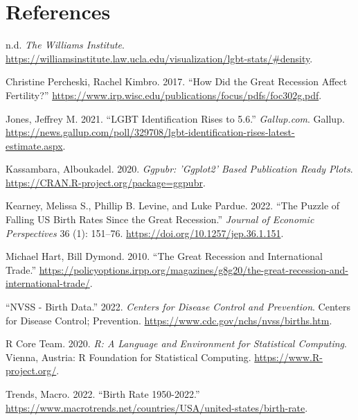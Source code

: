 \documentclass[
]{article}
\newlength{\cslhangindent}
\newlength{\cslentryspacingunit} %
\newenvironment{CSLReferences}[2] %
 {%
  \setlength{\parindent}{0pt}
  \ifodd #1
  \let\oldpar\par
  \def\par{\hangindent=\cslhangindent\oldpar}
  \fi
  \setlength{\parskip}{#2\cslentryspacingunit}
 }%
 {}
\begin{document}
\hypertarget{references}{%
\section*{References}\label{references}}

\hypertarget{refs}{}
\begin{CSLReferences}{1}{0}
\leavevmode{}%
n.d. \emph{The Williams Institute}. \url{https://williamsinstitute.law.ucla.edu/visualization/lgbt-stats/\#density}.

\leavevmode{}%
Christine Percheski, Rachel Kimbro. 2017. {``How Did the Great Recession Affect Fertility?''} \url{https://www.irp.wisc.edu/publications/focus/pdfs/foc302g.pdf}.

\leavevmode{}%
Jones, Jeffrey M. 2021. {``LGBT Identification Rises to 5.6.''} \emph{Gallup.com}. Gallup. \url{https://news.gallup.com/poll/329708/lgbt-identification-rises-latest-estimate.aspx}.

\leavevmode{}%
Kassambara, Alboukadel. 2020. \emph{Ggpubr: 'Ggplot2' Based Publication Ready Plots}. \url{https://CRAN.R-project.org/package=ggpubr}.

\leavevmode{}%
Kearney, Melissa S., Phillip B. Levine, and Luke Pardue. 2022. {``The Puzzle of Falling US Birth Rates Since the Great Recession.''} \emph{Journal of Economic Perspectives} 36 (1): 151--76. \url{https://doi.org/10.1257/jep.36.1.151}.

\leavevmode{}%
Michael Hart, Bill Dymond. 2010. {``The Great Recession and International Trade.''} \url{https://policyoptions.irpp.org/magazines/g8g20/the-great-recession-and-international-trade/}.

\leavevmode{}%
{``NVSS - Birth Data.''} 2022. \emph{Centers for Disease Control and Prevention}. Centers for Disease Control; Prevention. \url{https://www.cdc.gov/nchs/nvss/births.htm}.

\leavevmode{}%
R Core Team. 2020. \emph{R: A Language and Environment for Statistical Computing}. Vienna, Austria: R Foundation for Statistical Computing. \url{https://www.R-project.org/}.

\leavevmode{}%
Trends, Macro. 2022. {``Birth Rate 1950-2022.''} \url{https://www.macrotrends.net/countries/USA/united-states/birth-rate}.


\end{CSLReferences}
\end{document}
